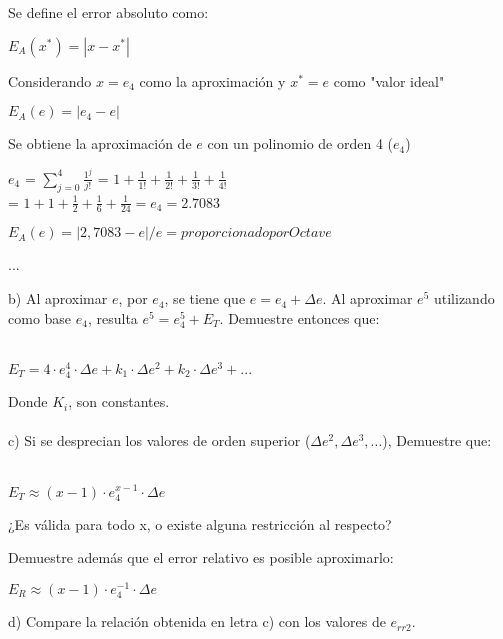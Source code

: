 \documentclass[]{article}
\begin{document}
Se define el error absoluto como:
\begin{center}
	$E_{A} (x^{*}) = |x-x^{*}|$
\end{center} 
 Considerando $x = e_{4}$ como la aproximación y $x^{*} = e$ como "valor ideal" \\
\begin{center} $E_{A} (e) = |e_{4}-e|$ \\
\end{center}

Se obtiene la aproximación de $e$ con un polinomio de orden 4 ($e_{4}$) 
\begin{center}
	$e_{4}$ = $\displaystyle\sum_{j=0}^{4} \displaystyle\frac{1^{j}}{j!}$ = $1 + \displaystyle\frac1{1!} + \displaystyle\frac1{2!} + \displaystyle\frac1{3!} + \displaystyle\frac1{4!}$ \\ 
	= $1 + 1 + \displaystyle\frac1{2} + \displaystyle\frac1{6} + \displaystyle\frac1{24} = e_{4} = 2.7083$
\end{center}
\begin{center} $E_{A} (e) = |2,7083-e|   / e = proporcionado por Octave $ \\
\end{center}
...


b) Al aproximar $e$, por $e_{4}$, se tiene que $e = e_{4} + \Delta e$. Al aproximar $e^{5}$ utilizando como base $e_{4}$, resulta $e^{5} = e_{4}^5 + E_{T}$. Demuestre entonces que:
\\\\
\begin{center} $E_{T} = 4 \cdot e_{4}^4 \cdot \Delta e + k_{1} \cdot \Delta {e}^2 + k_{2} \cdot \Delta e^{3} + ...$ \end{center} 

Donde $K_{i}$, son constantes. \\\\

c) Si se desprecian los valores de orden superior ($\Delta e^{2}, \Delta e^{3}, ...$), Demuestre que: \\\\
\begin{center} $E_{T} \approx (x-1) \cdot e_{4}^{x-1}\cdot \Delta e$ \end{center}

¿Es válida para todo x, o existe alguna restricción al respecto?

Demuestre además que el error relativo es posible aproximarlo:
\begin{center} $E_{R} \approx (x-1) \cdot e_{4}^{-1}\cdot \Delta e$ \end{center}
d) Compare la relación obtenida en letra c) con los valores de $e_{rr2}$. \\
\end{document}
